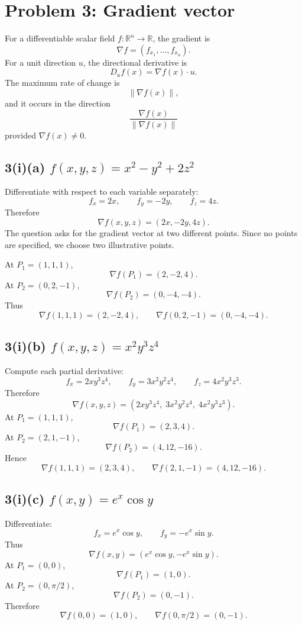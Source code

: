 \documentclass[11pt]{article}
\newcommand{\R}{\mathbb{R}}
\newcommand{\norm}[1]{\left\lVert #1\right\rVert}
\newcommand{\grad}{\nabla}
\begin{document}
\newpage
\section{Problem 3: Gradient vector}

\begin{methodbox}
For a differentiable scalar field $f:\R^n\to\R$, the gradient is
\[
 \grad f=(f_{x_1},\ldots,f_{x_n}).
\]
For a unit direction $u$, the directional derivative is
\[
 D_u f(x)=\grad f(x)\cdot u.
\]
The maximum rate of change is
\[
 \norm{\grad f(x)},
\]
and it occurs in the direction
\[
 \frac{\grad f(x)}{\norm{\grad f(x)}}
\]
provided $\grad f(x)\neq 0$.
\end{methodbox}

\subsection*{3(i)(a) $f(x,y,z)=x^2-y^2+2z^2$}
Differentiate with respect to each variable separately:
\[
 f_x=2x,
 \qquad
 f_y=-2y,
 \qquad
 f_z=4z.
\]
Therefore
\[
 \boxed{\grad f(x,y,z)=(2x,-2y,4z).}
\]
The question asks for the gradient vector at two different points. Since no points are specified, we choose two illustrative points.

At $P_1=(1,1,1)$,
\[
 \grad f(P_1)=(2,-2,4).
\]
At $P_2=(0,2,-1)$,
\[
 \grad f(P_2)=(0,-4,-4).
\]
Thus
\[
 \boxed{\grad f(1,1,1)=(2,-2,4),\qquad \grad f(0,2,-1)=(0,-4,-4).}
\]

\subsection*{3(i)(b) $f(x,y,z)=x^2y^3z^4$}
Compute each partial derivative:
\[
 f_x=2xy^3z^4,
 \qquad
 f_y=3x^2y^2z^4,
 \qquad
 f_z=4x^2y^3z^3.
\]
Therefore
\[
 \boxed{\grad f(x,y,z)=(2xy^3z^4,\;3x^2y^2z^4,\;4x^2y^3z^3).}
\]
At $P_1=(1,1,1)$,
\[
 \grad f(P_1)=(2,3,4).
\]
At $P_2=(2,1,-1)$,
\[
 \grad f(P_2)=(4,12,-16).
\]
Hence
\[
 \boxed{\grad f(1,1,1)=(2,3,4),\qquad \grad f(2,1,-1)=(4,12,-16).}
\]

\subsection*{3(i)(c) $f(x,y)=e^x\cos y$}
Differentiate:
\[
 f_x=e^x\cos y,
 \qquad
 f_y=-e^x\sin y.
\]
Thus
\[
 \boxed{\grad f(x,y)=(e^x\cos y,-e^x\sin y).}
\]
At $P_1=(0,0)$,
\[
 \grad f(P_1)=(1,0).
\]
At $P_2=(0,\pi/2)$,
\[
 \grad f(P_2)=(0,-1).
\]
Therefore
\[
 \boxed{\grad f(0,0)=(1,0),\qquad \grad f(0,\pi/2)=(0,-1).}
\]
\end{document}

